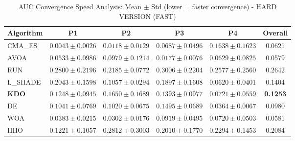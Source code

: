 \begin{table}[htbp]
\centering
\caption{AUC Convergence Speed Analysis: Mean $\pm$ Std (lower = faster convergence) - HARD VERSION (FAST)}
\label{tab:auc}
\small
\begin{tabular}{lccccc}
\toprule
\textbf{Algorithm} & \textbf{P1} & \textbf{P2} & \textbf{P3} & \textbf{P4} & \textbf{Overall} \\
\midrule
CMA_ES & $0.0043 \pm 0.0026$ & $0.0118 \pm 0.0129$ & $0.0687 \pm 0.0496$ & $0.1638 \pm 0.1623$ & 0.0621 \\
AVOA & $0.0533 \pm 0.0986$ & $0.0979 \pm 0.1214$ & $0.0177 \pm 0.0076$ & $0.0629 \pm 0.0825$ & 0.0579 \\
RUN & $0.2800 \pm 0.2196$ & $0.2185 \pm 0.0772$ & $0.3006 \pm 0.2204$ & $0.2577 \pm 0.2560$ & 0.2642 \\
L_SHADE & $0.2043 \pm 0.1598$ & $0.1057 \pm 0.0294$ & $0.1897 \pm 0.1608$ & $0.0620 \pm 0.0401$ & 0.1404 \\
\textbf{KDO} & $0.1248 \pm 0.0945$ & $0.1650 \pm 0.1689$ & $0.1393 \pm 0.0977$ & $0.0721 \pm 0.0559$ & \textbf{0.1253} \\
DE & $0.1041 \pm 0.0769$ & $0.1020 \pm 0.0675$ & $0.1495 \pm 0.0689$ & $0.0364 \pm 0.0067$ & 0.0980 \\
WOA & $0.0383 \pm 0.0215$ & $0.0302 \pm 0.0176$ & $0.0919 \pm 0.0495$ & $0.0720 \pm 0.0503$ & 0.0581 \\
HHO & $0.1221 \pm 0.1057$ & $0.2812 \pm 0.3003$ & $0.2010 \pm 0.1770$ & $0.2294 \pm 0.1453$ & 0.2084 \\
\bottomrule
\end{tabular}
\end{table}
